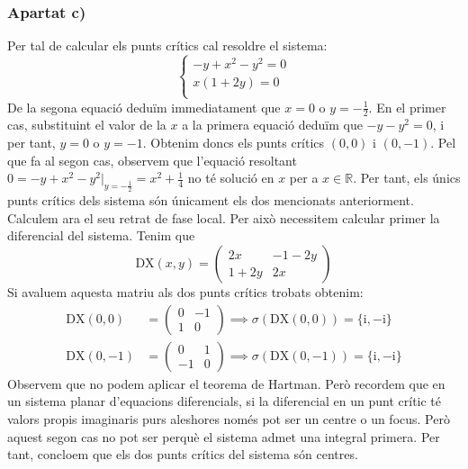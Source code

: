 \documentclass[10pt,a4paper]{article}
\newcommand{\RR}{\ensuremath{\mathbb{R}}}
\newcommand{\ii}{\mathrm{i}} %
\newcommand{\vf}[1]{\boldsymbol{\mathrm{#1}}} %
\begin{document}
\subsubsection*{Apartat c)}
Per tal de calcular els punts crítics cal resoldre el sistema:
$$
  \begin{cases}
    -y+x^2-y^2=0 \\
    x(1+2y)=0    \\
  \end{cases}
$$
De la segona equació deduïm immediatament que $x=0$ o $y=-\frac{1}{2}$. En el primer cas, substituint el valor de la $x$ a la primera equació deduïm que $-y-y^2=0$, i per tant, $y=0$ o $y=-1$. Obtenim doncs els punts crítics $(0,0)$ i $(0,-1)$. Pel que fa al segon cas, observem que l'equació resoltant $0=-y+x^2-y^2\big|_{y=-\frac{1}{2}}=x^2+\frac{1}{4}$ no té solució en $x$ per a $x\in\RR$. Per tant, els únics punts crítics dels sistema són únicament els dos mencionats anteriorment.
Calculem ara el seu retrat de fase local. Per això necessitem calcular primer la diferencial del sistema. Tenim que $$\vf{DX}(x,y)=\begin{pmatrix}
    2x   & -1-2y \\
    1+2y & 2x
  \end{pmatrix}$$
Si avaluem aquesta matriu als dos punts crítics trobats obtenim:
\begin{align*}
  \vf{DX}(0,0)  & =\begin{pmatrix}
                     0 & -1 \\
                     1 & 0
                   \end{pmatrix}\implies \sigma(\vf{DX}(0,0))=\{\ii,-\ii\}  \\
  \vf{DX}(0,-1) & =\begin{pmatrix}
                     0  & 1 \\
                     -1 & 0
                   \end{pmatrix}\implies \sigma(\vf{DX}(0,-1))=\{\ii,-\ii\}
\end{align*}
Observem que no podem aplicar el teorema de Hartman. Però recordem que en un sistema planar d'equacions diferencials, si la diferencial en un punt crític té valors propis imaginaris purs aleshores només pot ser un centre o un focus. Però aquest segon cas no pot ser perquè el sistema admet una integral primera. Per tant, concloem que els dos punts crítics del sistema són centres.
\end{document}
